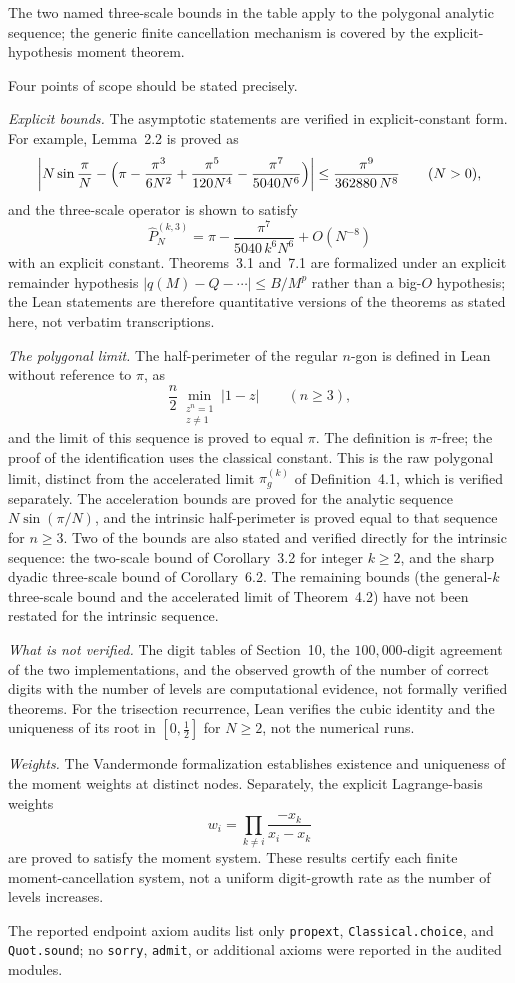 The two named three-scale bounds in the table apply to the polygonal analytic sequence; the generic finite cancellation mechanism is covered by the explicit-hypothesis moment theorem.

Four points of scope should be stated precisely.

\emph{Explicit bounds.} The asymptotic statements are verified in
explicit-constant form. For example, Lemma~2.2 is proved as
\[
\left|N\sin\frac{\pi}{N}
-\Bigl(\pi-\frac{\pi^3}{6N^2}+\frac{\pi^5}{120N^4}-\frac{\pi^7}{5040N^6}\Bigr)\right|
\le \frac{\pi^9}{362880\,N^8}
\qquad (N>0),
\]
and the three-scale operator is shown to satisfy
\[
\widehat P_N^{(k,3)}=\pi-\frac{\pi^7}{5040\,k^6N^6}+O(N^{-8})
\]
with an explicit constant. Theorems~3.1 and~7.1 are formalized under an
explicit remainder hypothesis $|q(M)-Q-\cdots|\le B/M^{p}$ rather than a
big-$O$ hypothesis; the Lean statements are therefore quantitative versions
of the theorems as stated here, not verbatim transcriptions.

\emph{The polygonal limit.} The half-perimeter of the regular $n$-gon is
defined in Lean without reference to $\pi$, as
\[
\frac{n}{2}\min_{\substack{z^n=1\\ z\ne 1}}|1-z| \qquad (n\ge 3),
\]
and the limit of this sequence is proved to equal $\pi$. The definition is
$\pi$-free; the proof of the identification uses the classical constant.
This is the raw polygonal limit, distinct from the accelerated limit
$\pi_g^{(k)}$ of Definition~4.1, which is verified separately.
The acceleration bounds are proved for the analytic sequence
$N\sin(\pi/N)$, and the intrinsic half-perimeter is proved equal to that
sequence for $n\ge 3$. Two of the bounds are also stated and verified
directly for the intrinsic sequence: the two-scale bound of Corollary~3.2
for integer $k\ge 2$, and the sharp dyadic three-scale bound of
Corollary~6.2. The remaining bounds (the general-$k$ three-scale bound and
the accelerated limit of Theorem~4.2) have not been restated for the
intrinsic sequence.

\emph{What is not verified.} The digit tables of Section~10, the
$100{,}000$-digit agreement of the two implementations, and the observed
growth of the number of correct digits with the number of levels are
computational evidence, not formally verified theorems. For the trisection
recurrence, Lean verifies the cubic identity and the uniqueness of its root
in $[0,\tfrac12]$ for $N\ge 2$, not the numerical runs.

\emph{Weights.} The Vandermonde formalization establishes existence and
uniqueness of the moment weights at distinct nodes. Separately, the explicit
Lagrange-basis weights
\[
w_i=\prod_{k\ne i}\frac{-x_k}{x_i-x_k}
\]
are proved to satisfy the moment system. These results certify each finite
moment-cancellation system, not a uniform digit-growth rate as the number of
levels increases.

The reported endpoint axiom audits list only \texttt{propext}, \texttt{Classical.choice},
and \texttt{Quot.sound}; no \texttt{sorry}, \texttt{admit}, or additional axioms were reported
in the audited modules.
